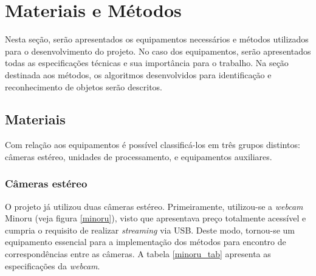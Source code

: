 \chapter{Materiais e Métodos}
\label{Materiais}


Nesta seção, serão apresentados os equipamentos necessários e métodos utilizados para o desenvolvimento do projeto. No caso dos equipamentos, serão apresentados todas as especificações técnicas e sua importância para o trabalho. Na seção destinada aos métodos, os algoritmos desenvolvidos para identificação e reconhecimento de objetos serão descritos.


\section{Materiais}

Com relação aos equipamentos é possível classificá-los em três grupos distintos: câmeras estéreo, unidades de processamento, e equipamentos auxiliares.


\subsection{Câmeras estéreo}

O projeto já utilizou duas câmeras estéreo. Primeiramente, utilizou-se a \textit{webcam} Minoru (veja figura \ref{minoru}), visto que apresentava preço totalmente acessível e cumpria o requisito de realizar \textit{streaming} via USB. Deste modo, tornou-se um equipamento essencial para a implementação dos métodos para encontro de correspondências entre as câmeras. A tabela \ref{minoru_tab} apresenta as especificações da \textit{webcam}.

